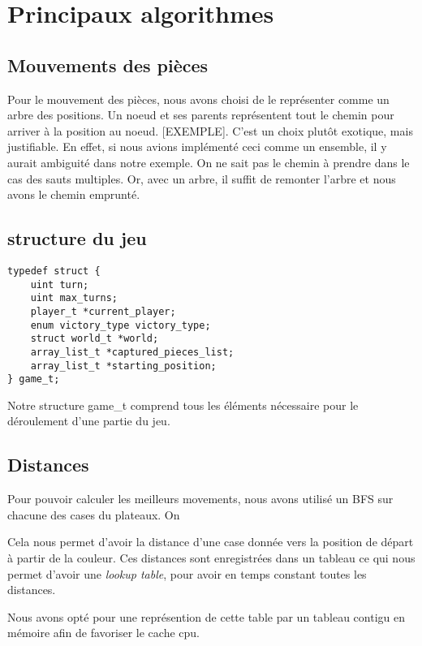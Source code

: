 \section*{Principaux algorithmes}
\subsection*{Mouvements des pièces}
Pour le mouvement des pièces, nous avons choisi de le représenter comme
un arbre des positions. Un noeud et ses parents représentent tout le 
chemin pour arriver à la position au noeud. [EXEMPLE]. C'est un choix
plutôt exotique, mais justifiable. En effet, si nous avions implémenté
ceci comme un ensemble, il y aurait ambiguité dans notre exemple.
On ne sait pas le chemin à prendre dans le cas des sauts multiples. Or,
avec un arbre, il suffit de remonter l'arbre et nous avons le chemin
emprunté.


\subsection*{structure du jeu}

\begin{verbatim}
typedef struct {
    uint turn;
    uint max_turns;
    player_t *current_player;
    enum victory_type victory_type;
    struct world_t *world;
    array_list_t *captured_pieces_list;
    array_list_t *starting_position;
} game_t;
\end{verbatim}


Notre structure game\_t comprend tous les éléments nécessaire pour le déroulement d'une partie du jeu.

\subsection*{Distances}
Pour pouvoir calculer les meilleurs movements, nous avons utilisé un BFS sur chacune des cases du plateaux. On 

Cela nous permet d'avoir la distance d'une case donnée vers la position de départ à partir de la couleur.
Ces distances sont enregistrées dans un tableau ce qui nous permet d'avoir une \emph{lookup table},
pour avoir en temps constant toutes les distances.

Nous avons opté pour une représention de cette table par un tableau contigu en mémoire afin de favoriser le cache cpu. 


